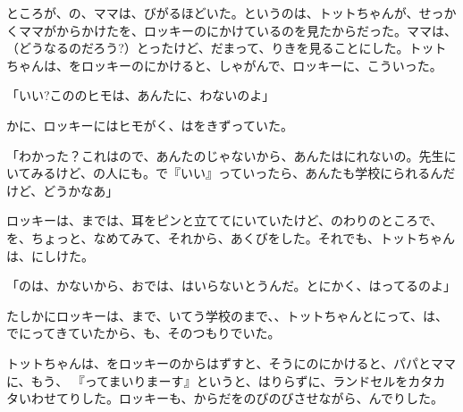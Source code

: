 ところが、の、ママは、びがるほどいた。というのは、トットちゃんが、せっかくママがからかけたを、ロッキーのにかけているのを見たからだった。ママは、（どうなるのだろう?）とったけど、だまって、りきを見ることにした。トットちゃんは、をロッキーのにかけると、しゃがんで、ロッキーに、こういった。

「いい?こののヒモは、あんたに、わないのよ」

かに、ロッキーにはヒモがく、はをきずっていた。

「わかった？これはので、あんたのじゃないから、あんたはにれないの。先生にいてみるけど、の人にも。で『いい』っていったら、あんたも学校にられるんだけど、どうかなあ」

ロッキーは、までは、耳をピンと立ててにいていたけど、のわりのところで、を、ちょっと、なめてみて、それから、あくびをした。それでも、トットちゃんは、にしけた。

「のは、かないから、おでは、はいらないとうんだ。とにかく、はってるのよ」

たしかにロッキーは、まで、いてう学校のまで、、トットちゃんとにって、は、でにってきていたから、も、そのつもりでいた。

トットちゃんは、をロッキーのからはずすと、そうにのにかけると、パパとママに、もう、 『ってまいりまーす』というと、はりらずに、ランドセルをカタカタいわせてりした。ロッキーも、からだをのびのびさせながら、んでりした。

